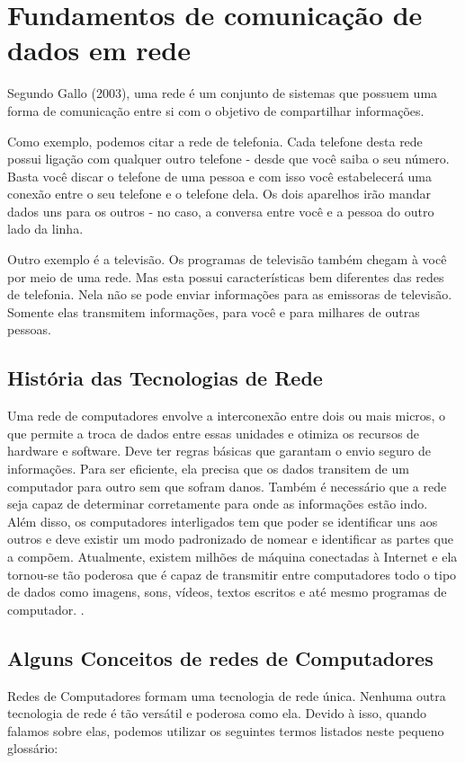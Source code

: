 \section{Fundamentos de comunicação de dados em rede}
Segundo \nocite{gallo2003comunicaccao}Gallo (2003), uma rede é um conjunto de sistemas que possuem uma forma de comunicação entre si com o objetivo de compartilhar informações.

Como exemplo, podemos citar a rede de telefonia. Cada telefone desta rede possui ligação com qualquer outro telefone - desde que você saiba o seu número. Basta você discar o telefone de uma pessoa e com isso você estabelecerá uma conexão entre o seu telefone e o telefone dela. Os dois aparelhos irão mandar dados uns para os outros - no caso, a conversa entre você e a pessoa do outro lado da linha.

Outro exemplo é a televisão. Os programas de televisão também chegam à você por meio de uma rede. Mas esta possui características bem diferentes das redes de telefonia. Nela não se pode enviar informações para as emissoras de televisão. Somente elas transmitem informações, para você e para milhares de outras pessoas.

	\subsection{História das Tecnologias de Rede}
	Uma rede de computadores envolve a interconexão entre dois ou mais micros, o que permite a troca de dados entre essas unidades e otimiza os recursos de hardware e software. Deve ter regras básicas que garantam o envio seguro de informações. Para ser eficiente, ela precisa que os dados transitem de um computador para outro sem que sofram danos. Também é necessário que a rede seja capaz de determinar corretamente para onde as informações estão indo. Além disso, os computadores interligados tem que poder se identificar uns aos outros e deve existir um modo padronizado de nomear e identificar as partes que a compõem. Atualmente, existem milhões de máquina conectadas à Internet e ela tornou-se tão poderosa que é capaz de transmitir entre computadores todo o tipo de dados como imagens, sons, vídeos, textos escritos e até mesmo programas de computador. \cite{forouzan2009comunicaccao}.
	
	\subsection{Alguns Conceitos de redes de Computadores}
	Redes de Computadores formam uma tecnologia de rede única. Nenhuma outra tecnologia de rede é tão versátil e poderosa como ela. Devido à isso, quando falamos sobre elas, podemos utilizar os seguintes termos listados neste pequeno glossário:
	

